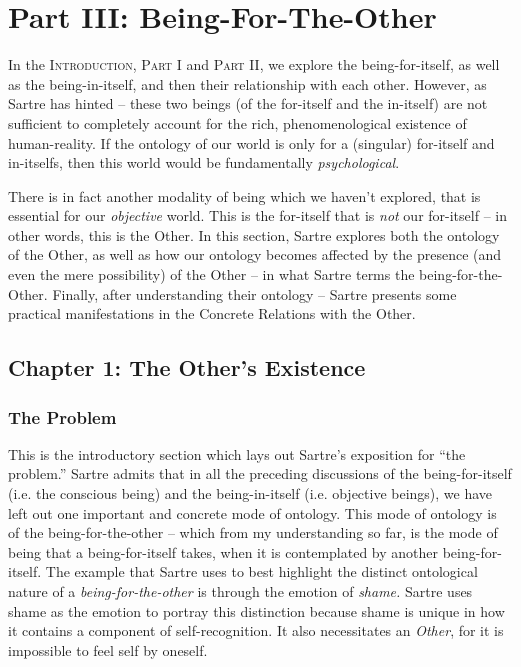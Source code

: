 \chapter{Part III: Being-For-The-Other}

In the \textsc{Introduction}, \textsc{Part I} and \textsc{Part II}, we explore the being-for-itself, as well as the being-in-itself, and then their relationship with each other. However, as Sartre has hinted -- these two beings (of the for-itself and the in-itself) are not sufficient to completely account for the rich, phenomenological existence of human-reality. If the ontology of our world is only for a (singular) for-itself and in-itselfs, then this world would be fundamentally \emph{psychological}.

There is in fact another modality of being which we haven't explored, that is essential for our \emph{objective} world. This is the for-itself that is \emph{not} our for-itself -- in other words, this is the Other. In this section, Sartre explores both the ontology of the Other, as well as how our ontology becomes affected by the presence (and even the mere possibility) of the Other -- in what Sartre terms the being-for-the-Other. Finally, after understanding their ontology -- Sartre presents some practical manifestations in the Concrete Relations with the Other.

\section{Chapter 1: The Other's Existence}

\subsection{The Problem}

This is the introductory section \autocite[307 -- 309]{sartre} which lays out Sartre's exposition for \enquote{the problem.}  Sartre admits that in all the preceding discussions of the being-for-itself (i.e. the conscious being) and the being-in-itself (i.e. objective beings), we have left out one important and concrete mode of ontology. This mode of ontology is of the being-for-the-other -- which from my understanding so far, is the mode of being that a being-for-itself takes, when it is contemplated by another being-for-itself. The example that Sartre uses to best highlight the distinct ontological nature of a \emph{being-for-the-other} is through the emotion of \emph{shame.} Sartre uses shame as the emotion to portray this distinction because shame is unique in how it contains a component of self-recognition. It also necessitates an \emph{Other}, for it is impossible to feel self by oneself. 

